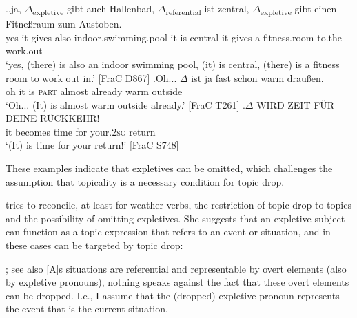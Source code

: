 \ex.\ag.\label{ex:expletive.frac.gibt}ja, $\Delta$\textsubscript{expletive} gibt auch Hallenbad, $\Delta$\textsubscript{referential} ist zentral, $\Delta$\textsubscript{expletive} gibt einen Fitneßraum zum Austoben.\\
yes it gives also indoor.swimming.pool it is central it gives a fitness.room to.the work.out \\
`yes, (there) is also an indoor swimming pool, (it) is central, (there) is a fitness room to work out in.' [FraC D867]
\bg.\label{ex:expletive.frac.warm}Oh... $\Delta$ ist ja fast schon warm draußen.\\
oh it is \textsc{part} almost already warm outside\\
`Oh... (It) is almost warm outside already.'
[FraC T261]
\cg.\label{ex:expletive.frac.besetzt}$\Delta$ WIRD ZEIT FÜR DEINE RÜCKKEHR!\\
it becomes time for your.\textsc{2sg} return\\
`(It) is time for your return!'
 [FraC S748]

These examples indicate that expletives  can be omitted, which challenges the assumption that topicality is a necessary condition for topic drop. 

\citet{trutkowski2011, trutkowski2016} tries to reconcile, at least for weather verbs, the restriction of topic drop to topics and the possibility of omitting expletives.
She suggests that an expletive subject can function as a topic expression that refers to an event or situation, and in these cases can be targeted by topic drop:
\begin{aquote}{\cite[120--121]{trutkowski2016}; see also \cite[213]{trutkowski2011}}
[A]s situations are referential and representable by overt elements (also by expletive pronouns), nothing speaks against the fact that these overt elements can be dropped.
I.e., I assume that the (dropped) expletive  pronoun represents the event that is the current situation.
\end{aquote}

